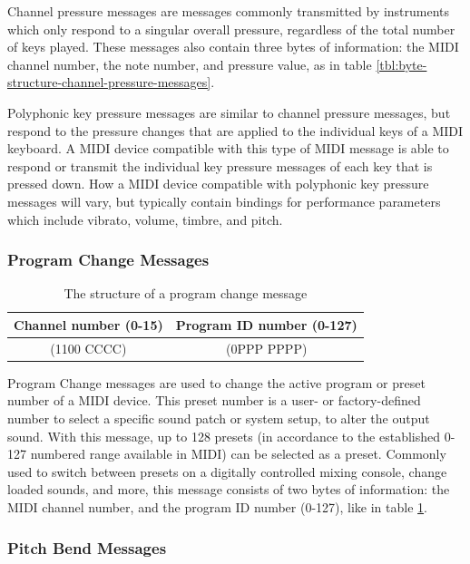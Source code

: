 Channel pressure messages are messages commonly transmitted by instruments which only respond to a singular overall pressure, regardless of the total number of keys played. These messages also contain three bytes of information: the MIDI channel number, the note number, and pressure value, as in table \ref{tbl:byte-structure-channel-pressure-messages}\cite{Huber_2012}. 

Polyphonic key pressure messages are similar to channel pressure messages, but respond to the pressure changes that are applied to the individual keys of a MIDI keyboard. A MIDI device compatible with this type of MIDI message is able to respond or transmit the individual key pressure messages of each key that is pressed down. How a MIDI device compatible with polyphonic key pressure messages will vary, but typically contain bindings for performance parameters which include vibrato, volume, timbre, and pitch\cite{McGuire_2014}. %

\subsubsection{Program Change Messages}

\begin{table}
	\centering
	\begin{tabular}{|c|c|}
	\hline
		Channel number (0-15) & Program ID number (0-127) \\
		\hline
		(1100 CCCC) & (0PPP PPPP) \\
	\hline
	\end{tabular}
	\caption{The structure of a program change message}
	\label{tbl:byte-structure-program-change}
\end{table}

Program Change messages are used to change the active program or preset number of a MIDI device. This preset number is a user- or factory-defined number to select a specific sound patch or system setup, to alter the output sound. With this message, up to 128 presets (in accordance to the established 0-127 numbered range available in MIDI) can be selected as a preset\cite{Huber_2012}. Commonly used to switch between presets on a digitally controlled mixing console, change loaded sounds, and more, this message consists of two bytes of information: the MIDI channel number, and the program ID number (0-127), like in table \ref{tbl:byte-structure-program-change}.


\subsubsection{Pitch Bend Messages}

